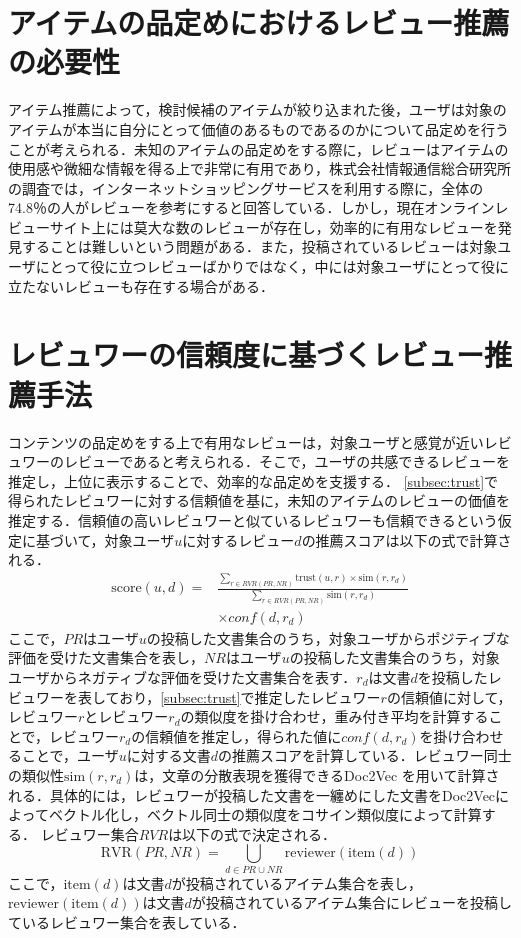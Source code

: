 \documentclass[a4paper,11pt,oneside,openany]{jsbook}
\begin{document}
	\section{アイテムの品定めにおけるレビュー推薦の必要性}
アイテム推薦によって，検討候補のアイテムが絞り込まれた後，ユーザは対象のアイテムが本当に自分にとって価値のあるものであるのかについて品定めを行うことが考えられる．未知のアイテムの品定めをする際に，レビューはアイテムの使用感や微細な情報を得る上で非常に有用であり，株式会社情報通信総合研究所の調査\cite{ict}では，インターネットショッピングサービスを利用する際に，全体の74.8％の人がレビューを参考にすると回答している．しかし，現在オンラインレビューサイト上には莫大な数のレビューが存在し，効率的に有用なレビューを発見することは難しいという問題がある．また，投稿されているレビューは対象ユーザにとって役に立つレビューばかりではなく，中には対象ユーザにとって役に立たないレビューも存在する場合がある．

	\section{レビュワーの信頼度に基づくレビュー推薦手法}
コンテンツの品定めをする上で有用なレビューは，対象ユーザと感覚が近いレビュワーのレビューであると考えられる．そこで，ユーザの共感できるレビューを推定し，上位に表示することで、効率的な品定めを支援する．
\ref{subsec:trust}で得られたレビュワーに対する信頼値を基に，未知のアイテムのレビューの価値を推定する．信頼値の高いレビュワーと似ているレビュワーも信頼できるという仮定に基づいて，対象ユーザ$u$に対するレビュー$d$の推薦スコアは以下の式で計算される．
\begin{equation}
\begin{split}
\mathrm{score}(u ,d)=&\frac{\sum_{r\in{RVR(PR, NR)}} \mathrm{trust}(u,r) \times \mathrm{sim}(r, r_d)}{\sum_{r\in{RVR(PR, NR)}} \mathrm{sim}(r, r_d)}\\
&\times conf(d, r_d)
\end{split}
\end{equation}
ここで，$PR$はユーザ$u$の投稿した文書集合のうち，対象ユーザからポジティブな評価を受けた文書集合を表し，$NR$はユーザ$u$の投稿した文書集合のうち，対象ユーザからネガティブな評価を受けた文書集合を表す．$r_d$は文書$d$を投稿したレビュワーを表しており，\ref{subsec:trust}で推定したレビュワー$r$の信頼値に対して，レビュワー$r$とレビュワー$r_d$の類似度を掛け合わせ，重み付き平均を計算することで，レビュワー$r_d$の信頼値を推定し，得られた値に$conf(d, r_d)$を掛け合わせることで，ユーザ$u$に対する文書$d$の推薦スコアを計算している．レビュワー同士の類似性$\mathrm{sim}(r, r_d)$は，文章の分散表現を獲得できるDoc2Vec \cite{doc2vec} を用いて計算される．具体的には，レビュワーが投稿した文書を一纏めにした文書をDoc2Vecによってベクトル化し，ベクトル同士の類似度をコサイン類似度によって計算する．
レビュワー集合$RVR$は以下の式で決定される．
\begin{equation}
\mathrm{RVR}(PR ,NR)=\bigcup_{d\in{PR\cup NR}} \mathrm{reviewer}(\mathrm{item}(d))
\end{equation}
ここで，$\mathrm{item}(d)$は文書$d$が投稿されているアイテム集合を表し，$\mathrm{reviewer}(\mathrm{item}(d))$は文書$d$が投稿されているアイテム集合にレビューを投稿しているレビュワー集合を表している．
\end{document}
